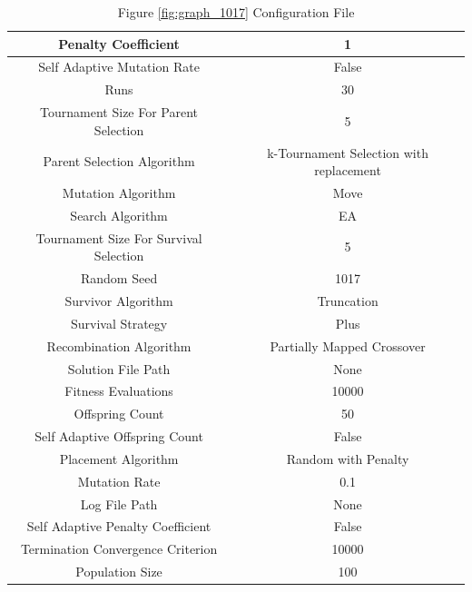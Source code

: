 \documentclass{standalone}
\begin{document}
\begin{table}[!htb]
	\centering
	\caption{Figure \ref{fig:graph_1017} Configuration File}
	\label{tab:graph_1017}
	\begin{tabular}{| c | c |}
		\hline
		Penalty Coefficient		& 1		 \\
		\hline
		Self Adaptive Mutation Rate		& False		 \\
		\hline
		Runs		& 30		 \\
		\hline
		Tournament Size For Parent Selection		& 5		 \\
		\hline
		Parent Selection Algorithm		& k-Tournament Selection with replacement		 \\
		\hline
		Mutation Algorithm		& Move		 \\
		\hline
		Search Algorithm		& EA		 \\
		\hline
		Tournament Size For Survival Selection		& 5		 \\
		\hline
		Random Seed		& 1017		 \\
		\hline
		Survivor Algorithm		& Truncation		 \\
		\hline
		Survival Strategy		& Plus		 \\
		\hline
		Recombination Algorithm		& Partially Mapped Crossover		 \\
		\hline
		Solution File Path		& None		 \\
		\hline
		Fitness Evaluations		& 10000		 \\
		\hline
		Offspring Count		& 50		 \\
		\hline
		Self Adaptive Offspring Count		& False		 \\
		\hline
		Placement Algorithm		& Random with Penalty		 \\
		\hline
		Mutation Rate		& 0.1		 \\
		\hline
		Log File Path		& None		 \\
		\hline
		Self Adaptive Penalty Coefficient		& False		 \\
		\hline
		Termination Convergence Criterion		& 10000		 \\
		\hline
		Population Size		& 100		 \\
		\hline
	\end{tabular}
\end{table}
\end{document}
